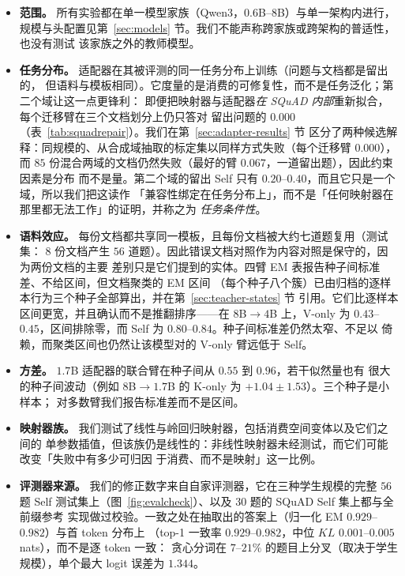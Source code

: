 \documentclass[11pt]{article}
\begin{document}
\begin{itemize}
\item \textbf{范围。} 所有实验都在单一模型家族（Qwen3，$0.6$B--$8$B）与单一架构内进行，
  规模与头配置见第~\ref{sec:models} 节。我们不能声称跨家族或跨架构的普适性，也没有测试
  该家族之外的教师模型。
\item \textbf{任务分布。} 适配器在其被评测的同一任务分布上训练（问题与文档都是留出的，
  但语料与模板相同）。它度量的是消费的可修复性，而不是任务泛化；第二个域让这一点更锋利：
  即便把映射器与适配器\emph{在 SQuAD 内部}重新拟合，每个迁移臂在三个文档划分上仍只答对
  留出问题的 $0.000$（表~\ref{tab:squadrepair}）。我们在第~\ref{sec:adapter-results} 节
  区分了两种候选解释：同规模的、从合成域抽取的标定集以同样方式失败（每个迁移臂 $0.000$），
  而 $85$ 份混合两域的文档仍然失败（最好的臂 $0.067$，一道留出题），因此约束因素是分布
  而不是量。第二个域的留出 Self 只有 $0.20$--$0.40$，而且它只是一个域，所以我们把这读作
  「兼容性绑定在任务分布上」，而不是「任何映射器在那里都无法工作」的证明，并称之为
  \emph{任务条件性}。
\item \textbf{语料效应。} 每份文档都共享同一模板，且每份文档被大约七道题复用（测试集：
  $8$ 份文档产生 $56$ 道题）。因此错误文档对照作为内容对照是保守的，因为两份文档的主要
  差别只是它们提到的实体。四臂 EM 表报告种子间标准差、不给区间，但文档聚类的 EM 区间
  （每个种子八个簇）已由归档的逐样本行为三个种子全部算出，并在第~\ref{sec:teacher-states} 节
  引用。它们比逐样本区间更宽，并且确认而不是推翻排序——在 $8$B$\to4$B 上，V-only 为
  $0.43$--$0.45$，区间排除零，而 Self 为 $0.80$--$0.84$。种子间标准差仍然太窄、不足以
  倚赖，而聚类区间也仍然让该模型对的 V-only 臂远低于 Self。
\item \textbf{方差。} $1.7$B 适配器的联合臂在种子间从 $0.55$ 到 $0.96$，若干似然量也有
  很大的种子间波动（例如 $8$B$\to1.7$B 的 K-only 为 $+1.04 \pm 1.53$）。三个种子是小样本；
  对多数臂我们报告标准差而不是区间。
\item \textbf{映射器族。} 我们测试了线性与岭回归映射器，包括消费空间变体以及它们之间的
  单参数插值，但该族仍是线性的：非线性映射器未经测试，而它们可能改变「失败中有多少可归因
  于消费、而不是映射」这一比例。
\item \textbf{评测器来源。} 我们的修正数字来自自家评测器，它在三种学生规模的完整 $56$ 题
  Self 测试集上（图~\ref{fig:evalcheck}）、以及 $30$ 题的 SQuAD Self 集上都与全前缀参考
  实现做过校验。一致之处在抽取出的答案上（归一化 EM $0.929$--$0.982$）与首 token 分布上
  （top-1 一致率 $0.929$--$0.982$，中位 $KL$ $0.001$--$0.005$ nats），而不是逐 token 一致：
  贪心分词在 $7$--$21\%$ 的题目上分叉（取决于学生规模），单个最大 logit 误差为 $1.344$。

\end{itemize}
\end{document}
